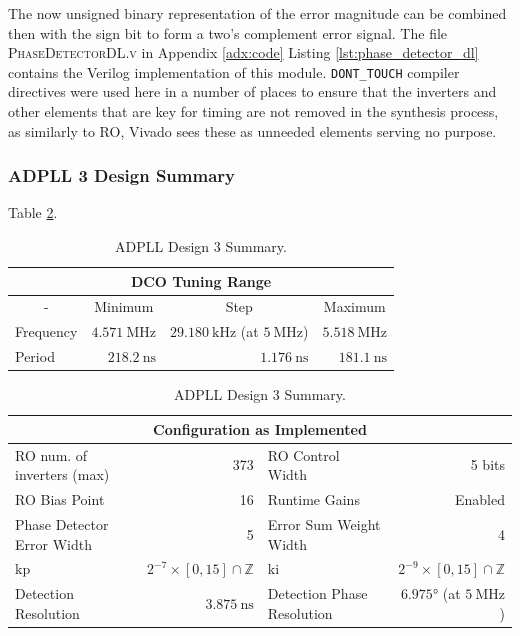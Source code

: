 The now unsigned binary representation of the error magnitude can be combined then with the sign bit to form a two's complement error signal. The file \textsc{PhaseDetectorDL.v} in Appendix \ref{adx:code} Listing \ref{lst:phase_detector_dl} contains the Verilog implementation of this module. \texttt{DONT\_TOUCH} compiler directives were used here in a number of places to ensure that the inverters and other elements that are key for timing are not removed in the synthesis process, as similarly to \ac{RO}, Vivado sees these as unneeded elements serving no purpose.

\subsubsection{\acs{ADPLL} 3 Design Summary}
Table \ref{table:adpll3}.

\begin{table}[!h]%
	\begin{center}
		\begin{tabular}{|l|r|r|r|}
			\multicolumn{4}{c}{\ac{DCO} Tuning Range} \T\\
			\hline
			\multicolumn{1}{|c|}{-} & \multicolumn{1}{c|}{Minimum} & \multicolumn{1}{c|}{Step} & \multicolumn{1}{c|}{Maximum} \T\\
			\hline
			Frequency & $4.571~\si{\mega\hertz}$ & $29.180~\si{\kilo\hertz}$ (at $5~\si{\mega\hertz}$) & $5.518~\si{\mega\hertz}$ \T\\
			\hline
			Period & $218.2~\si{\nano\second}$ & $1.176~\si{\nano\second}$ & $181.1~\si{\nano\second}$ \T\\
			\hline
		\end{tabular}
		\begin{tabular}{|l|r|l|r|}
			\multicolumn{4}{c}{Configuration as Implemented} \T\\
			\hline
			\ac{RO} num. of inverters (max) & 373 & \ac{RO} Control Width & 5 bits \T\\
			\hline
			\ac{RO} Bias Point & 16 & Runtime Gains & Enabled \T\\
			\hline
			Phase Detector Error Width & 5 & Error Sum Weight Width & 4 \T\\
			\hline
			\acs{kp} & $2^{-7}\times[0,15]\cap\mathbb{Z}$ & \acs{ki} & $2^{-9}\times[0,15]\cap\mathbb{Z}$ \T\\
			\hline
			Detection Resolution & $3.875~\si{\nano\second}$ & Detection Phase Resolution & $6.975\si{\degree}$ (at $5~\si{\mega\hertz}$)\\
			\hline
		\end{tabular}
	\end{center}
	\caption[\ac{ADPLL} Design 3 Summary]{\ac{ADPLL} Design 3 Summary.}
	\label{table:adpll3}
\end{table}


